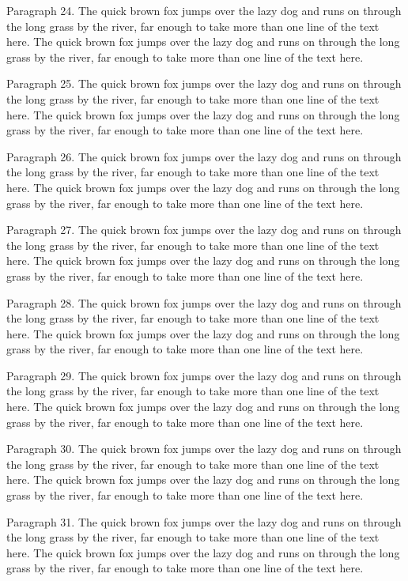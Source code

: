 \documentclass{article}
\begin{document}
Paragraph 24. The quick brown fox jumps over the lazy dog and runs on through the long grass by the river, far enough to take more than one line of the text here. The quick brown fox jumps over the lazy dog and runs on through the long grass by the river, far enough to take more than one line of the text here.

Paragraph 25. The quick brown fox jumps over the lazy dog and runs on through the long grass by the river, far enough to take more than one line of the text here. The quick brown fox jumps over the lazy dog and runs on through the long grass by the river, far enough to take more than one line of the text here.

Paragraph 26. The quick brown fox jumps over the lazy dog and runs on through the long grass by the river, far enough to take more than one line of the text here. The quick brown fox jumps over the lazy dog and runs on through the long grass by the river, far enough to take more than one line of the text here.

Paragraph 27. The quick brown fox jumps over the lazy dog and runs on through the long grass by the river, far enough to take more than one line of the text here. The quick brown fox jumps over the lazy dog and runs on through the long grass by the river, far enough to take more than one line of the text here.

Paragraph 28. The quick brown fox jumps over the lazy dog and runs on through the long grass by the river, far enough to take more than one line of the text here. The quick brown fox jumps over the lazy dog and runs on through the long grass by the river, far enough to take more than one line of the text here.

Paragraph 29. The quick brown fox jumps over the lazy dog and runs on through the long grass by the river, far enough to take more than one line of the text here. The quick brown fox jumps over the lazy dog and runs on through the long grass by the river, far enough to take more than one line of the text here.

Paragraph 30. The quick brown fox jumps over the lazy dog and runs on through the long grass by the river, far enough to take more than one line of the text here. The quick brown fox jumps over the lazy dog and runs on through the long grass by the river, far enough to take more than one line of the text here.

Paragraph 31. The quick brown fox jumps over the lazy dog and runs on through the long grass by the river, far enough to take more than one line of the text here. The quick brown fox jumps over the lazy dog and runs on through the long grass by the river, far enough to take more than one line of the text here.
\end{document}
